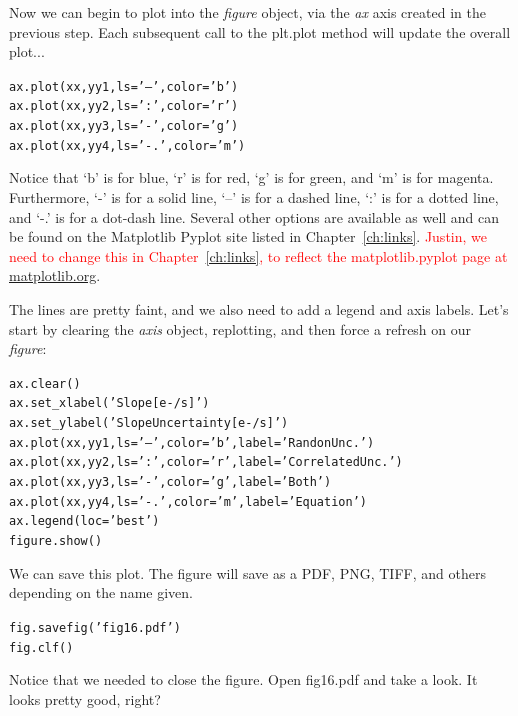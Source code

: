 Now we can begin to plot into the \textit{figure} object, via the \textit{ax} 
axis created in the previous step. Each subsequent call to the plt.plot 
method will update the overall plot... 

\begin{alltt}
\pytab ax.plot(xx, yy1, ls='--', color='b')
\pytab ax.plot(xx, yy2, ls=':', color='r')
\pytab ax.plot(xx, yy3, ls='-', color='g')
\pytab ax.plot(xx, yy4, ls='-.', color='m')
\end{alltt}

Notice that `b' is for blue, `r' is for red, `g' is for green, and `m'
is for magenta.  Furthermore, `-' is for a solid line, `--' is for a
dashed line, `:' is for a dotted line, and `-.' is for a dot-dash
line.  Several other options are available as well and can be found on
the Matplotlib Pyplot site listed in Chapter~\ref{ch:links}. 
\textcolor{red}{Justin, we need to change this in Chapter~\ref{ch:links}, 
to reflect the matplotlib.pyplot page at } 
\href{http://matplotlib.org/api/pyplot_summary.html}{matplotlib.org}.

The lines are pretty faint, and we also need to add a legend and axis
labels. Let's start by clearing the \textit{axis} object, replotting, and then 
force a refresh on our \textit{figure}:

\begin{alltt}
\pytab ax.clear()
\pytab ax.set_xlabel('Slope [e-/s]')
\pytab ax.set_ylabel('Slope Uncertainty [e-/s]')
\pytab ax.plot(xx, yy1, ls='--', color='b', label='Randon Unc.')
\pytab ax.plot(xx, yy2, ls=':', color='r', label='Correlated Unc.')
\pytab ax.plot(xx, yy3, ls='-', color='g', label='Both')
\pytab ax.plot(xx, yy4, ls='-.', color='m', label='Equation')
\pytab ax.legend(loc='best')
\pytab figure.show()
\end{alltt}

We can save this plot.  The figure will save as a PDF, PNG, TIFF, and
others depending on the name given.

\begin{alltt}
\pytab fig.savefig('fig16.pdf')
\pytab fig.clf()
\end{alltt}

Notice that we needed to close the figure.  Open fig16.pdf and take a
look.  It looks pretty good, right?  

